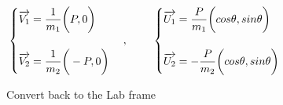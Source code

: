 \documentclass[fleqn]{article}
\begin{document}
$
  \\
  \begin{cases}
    \overrightarrow{V_1}=\dfrac{1}{m_1} \bigg( P,0 \bigg)
    \\
    \\
    \overrightarrow{V_2}=\dfrac{1}{m_2} \bigg( -P,0 \bigg)
  \end{cases}, ~~~~~~~
  \begin{cases}
    \overrightarrow{U_1}=\dfrac{P}{m_1} \bigg( cos \theta, sin \theta \bigg)
    \\
    \\
    \overrightarrow{U_2}=-\dfrac{P}{m_2} \bigg( cos \theta, sin \theta \bigg)
  \end{cases}
  \\
  \\
$

Convert back to the Lab frame

\vspace{10px}
\end{document}
